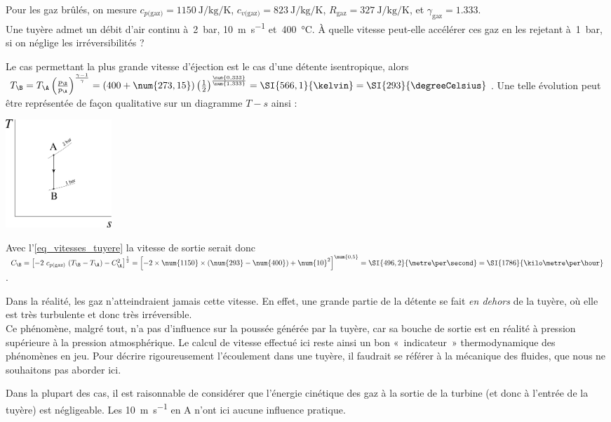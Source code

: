 		\begin{anexample}
		\label{exemple_tuyere}
			Pour les gaz brûlés, on mesure $c_{p\text{(gaz)}} = \SI{1150}{\joule\per\kilogram\per\kelvin}$, $c_{v\text{(gaz)}} = \SI{823}{\joule\per\kilogram\per\kelvin}$, $R_\text{gaz} = \SI{327}{\joule\per\kilogram\per\kelvin}$, et $\gamma_\text{gaz} = \num{1,333}$.\\
			Une tuyère admet un débit d’air continu à~\SI{2}{\bar}, \SI{10}{\metre\per\second} et~\SI{400}{\degreeCelsius}. À quelle vitesse peut-elle accélérer ces gaz en les rejetant à~\SI{1}{\bar}, si on néglige les irréversibilités ?
				\begin{answer}
					Le cas permettant la plus grande vitesse d’éjection est le cas d’une détente isentropique, alors
					$T_\B = T_\A \left(\frac{p_\B}{p_\A}\right)^{\frac{\gamma - 1}{\gamma}}
					 			= (400 + \num{273,15}) \left(\frac{1}{2}\right)^{\frac{\num{0,333}}{\num{1,333}}}
					 			= \SI{566,1}{\kelvin} = \SI{293}{\degreeCelsius}$.
					Une telle évolution peut être représentée de façon qualitative sur un diagramme $T-s$ ainsi :
						\begin{center}\includegraphics[width=4cm]{images/exe_ts_tuyere.png}\end{center}
					Avec l’\cref{eq_vitesses_tuyere} la vitesse de sortie serait donc
					$C_\B = \left[ - 2 \ c_{p \text{(gaz)}} \ (T_\B - T_\A) - C_\A^2 \right]^{\frac{1}{2}}
							= \left[ - 2 \times \num{1150} \times (\num{293} - \num{400}) + \num{10}^2 \right]^{\num{0,5}}
							= \SI{496,2}{\metre\per\second} = \SI{1786}{\kilo\metre\per\hour}$.
								\begin{remark}
									Dans la réalité, les gaz n’atteindraient jamais cette vitesse. En effet, une grande partie de la détente se fait \emph{en dehors} de la tuyère, où elle est très turbulente et donc très irréversible.\\
									Ce phénomène, malgré tout, n’a pas d’influence sur la poussée générée par la tuyère, car sa bouche de sortie est en réalité à pression supérieure à la pression atmosphérique. Le calcul de vitesse effectué ici reste ainsi un bon «~indicateur~» thermodynamique des phénomènes en jeu. Pour décrire rigoureusement l’écoulement dans une tuyère, il faudrait se référer à la mécanique des fluides, que nous ne souhaitons pas aborder ici.
								\end{remark}
								\begin{remark}
									Dans la plupart des cas, il est raisonnable de considérer que l’énergie cinétique des gaz à la sortie de la turbine (et donc à l’entrée de la tuyère) est négligeable. Les \SI{10}{\metre\per\second} en A n’ont ici aucune influence pratique.
								\end{remark}
				\end{answer}
		\end{anexample}

